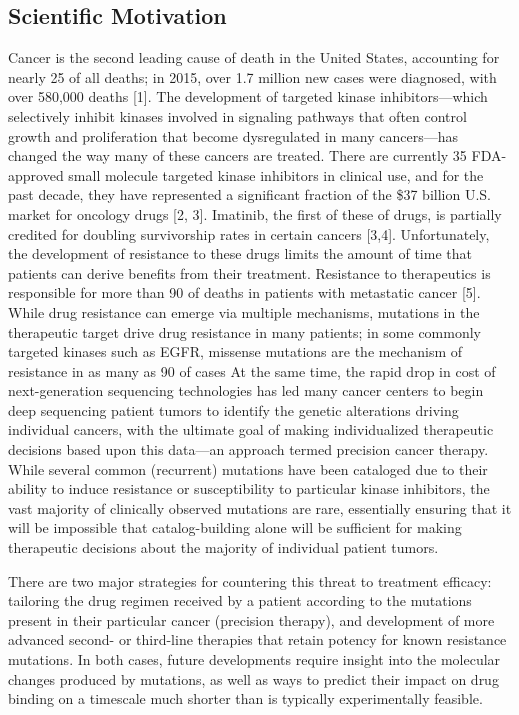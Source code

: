 \documentclass[conference]{IEEEtran}
\begin{document}

\subsection{Scientific Motivation}\label{sec:motivation}

Cancer is the second leading cause of death in the United States, accounting for nearly 25 of all deaths; in 2015, over 1.7 million new cases were diagnosed, with over 580,000 deaths [1]. The development of targeted kinase inhibitors—which selectively inhibit kinases involved in signaling pathways that often control growth and proliferation that become dysregulated in many cancers—has changed the way many of these cancers are treated. There are currently 35 FDA-approved small molecule targeted kinase inhibitors in clinical use, and for the past decade, they have represented a significant fraction of the \$37 billion U.S. market for oncology drugs [2, 3]. Imatinib, the first of these of drugs, is partially credited for doubling survivorship rates in certain cancers [3,4]. Unfortunately, the development of resistance to these drugs limits the amount of time that patients can derive benefits from their treatment. Resistance to therapeutics is responsible for more than 90 of deaths in patients with metastatic cancer [5]. While drug resistance can emerge via multiple mechanisms, mutations in the therapeutic target drive drug resistance in many patients; in some commonly targeted kinases such as EGFR, missense mutations are the mechanism of resistance in as many as 90 of cases           
At the same time, the rapid drop in cost of next-generation sequencing technologies has led many cancer centers to begin deep sequencing patient tumors to identify the genetic alterations driving individual cancers, with the ultimate goal of making individualized therapeutic decisions based upon this data—an approach termed precision cancer therapy. While several common (recurrent) mutations have been cataloged due to their ability to induce resistance or susceptibility to particular kinase inhibitors, the vast majority of clinically observed mutations are rare, essentially ensuring that it will be impossible that catalog-building alone will be sufficient for making therapeutic decisions about the majority of individual patient tumors.

There are two major strategies for countering this threat to treatment efficacy: tailoring the drug regimen received by a patient according to the mutations present in their particular cancer (precision therapy), and development of more advanced second- or third-line therapies that retain potency for known resistance mutations. In both cases, future developments require insight into the molecular changes produced by mutations, as well as ways to predict their impact on drug binding on a timescale much shorter than is typically experimentally feasible. 
\end{document}
